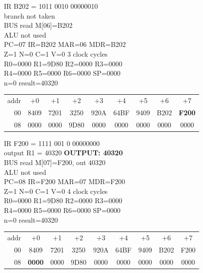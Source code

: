 \noindent\begin{tcolorbox}[stepbox, title={Step 42 \hfill PC 06 \quad BNE loop}]
\textcolor{dim}{IR} B202 = 1011 0010 00000010\\
branch not taken\\
\textcolor{dim}{BUS} read M[06]=B202\\
\textcolor{dim}{ALU} \textcolor{dim}{not used}\\
PC=07 IR=B202 MAR=06 MDR=B202\\
Z=1 N=0 C=1 V=0 \hfill \textcolor{dim}{3 clock cycles}\\
R0=0000 R1=9D80 R2=0000 R3=0000\\
R4=0000 R5=0000 R6=0000 SP=0000\\
\textcolor{dim}{n=0  result=40320}\\[1pt]
{\setlength{\tabcolsep}{1.6pt}\begin{tabular}{@{}r*{8}{c}@{}}
\textcolor{dim}{addr} & \textcolor{dim}{+0} & \textcolor{dim}{+1} & \textcolor{dim}{+2} & \textcolor{dim}{+3} & \textcolor{dim}{+4} & \textcolor{dim}{+5} & \textcolor{dim}{+6} & \textcolor{dim}{+7}\\
\textcolor{dim}{00} & 8409 & 7201 & 3250 & 920A & 64BF & 9409 & B202 & \cellcolor{pcc}\textbf{F200}\\
\textcolor{dim}{08} & 0000 & \cellcolor{datac}0000 & \cellcolor{datac}9D80 & 0000 & 0000 & 0000 & 0000 & 0000\\
\end{tabular}}
\end{tcolorbox}\hfill\begin{tcolorbox}[stepbox, title={Step 43 \hfill PC 07 \quad OUT R1}]
\textcolor{dim}{IR} F200 = 1111 001 0 00000000\\
output R1 = 40320 \hfill \colorbox{outc}{\textbf{OUTPUT: 40320}}\\
\textcolor{dim}{BUS} read M[07]=F200, out 40320\\
\textcolor{dim}{ALU} \textcolor{dim}{not used}\\
PC=08 IR=F200 MAR=07 MDR=F200\\
Z=1 N=0 C=1 V=0 \hfill \textcolor{dim}{4 clock cycles}\\
R0=0000 R1=9D80 R2=0000 R3=0000\\
R4=0000 R5=0000 R6=0000 SP=0000\\
\textcolor{dim}{n=0  result=40320}\\[1pt]
{\setlength{\tabcolsep}{1.6pt}\begin{tabular}{@{}r*{8}{c}@{}}
\textcolor{dim}{addr} & \textcolor{dim}{+0} & \textcolor{dim}{+1} & \textcolor{dim}{+2} & \textcolor{dim}{+3} & \textcolor{dim}{+4} & \textcolor{dim}{+5} & \textcolor{dim}{+6} & \textcolor{dim}{+7}\\
\textcolor{dim}{00} & 8409 & 7201 & 3250 & 920A & 64BF & 9409 & B202 & F200\\
\textcolor{dim}{08} & \cellcolor{pcc}\textbf{0000} & \cellcolor{datac}0000 & \cellcolor{datac}9D80 & 0000 & 0000 & 0000 & 0000 & 0000\\
\end{tabular}}
\end{tcolorbox}\par\vspace{3pt}
